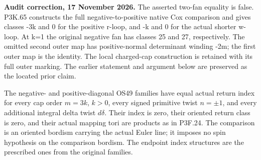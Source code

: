 \begin{theorem}\label{night:P3K.17}
\par\noindent\textbf{Audit correction, 17 November 2026.} The asserted two-fan equality is false. P3K.65 constructs the full negative-to-positive native Cox comparison and gives classes -3k and 0 for the positive r-loop, and -k and 0 for the actual shorter w-loop. At k=1 the original negative fan has classes 25 and 27, respectively. The omitted second outer map has positive-normal determinant winding -2m; the first outer map is the identity. The local charged-cap construction is retained with its full outer marking. The earlier statement and argument below are preserved as the located prior claim.
\medskip

The negative- and positive-diagonal OS49 families have equal
actual return index for every cap order \(m=3k\),
\(k>0\), every signed primitive twist \(n=\pm1\),
and every additional integral delta twist \(d\delta\).
Their index is zero, their oriented return class is zero, and
their actual mapping tori are products as in P3F.24.
The comparison is an oriented bordism carrying the actual
Euler line; it imposes no spin hypothesis on the comparison
bordism.  The endpoint index structures are the prescribed
ones from the original families.
\end{theorem}

